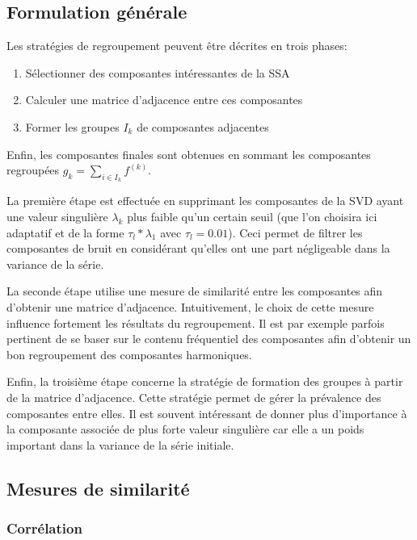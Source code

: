 \documentclass{gretsi}
\begin{document}
\subsection{Formulation générale}
\label{sub:form}

Les stratégies de regroupement peuvent être décrites en trois phases:
\begin{enumerate}
	\item Sélectionner des composantes intéressantes de la SSA
	\item Calculer une matrice d'adjacence entre ces composantes
	\item Former les groupes $I_k$ de composantes adjacentes
\end{enumerate}
Enfin, les composantes finales sont obtenues en sommant les composantes regroupées $g_k = \sum_{i\in I_k} f^{(k)}$.

La première étape est effectuée en supprimant les composantes de la SVD ayant une valeur singulière $\lambda_k$ plus faible qu'un certain seuil (que l'on choisira ici adaptatif et de la forme  $\tau_l*\lambda_1$ avec $\tau_l = 0.01$).
Ceci permet de filtrer les composantes de bruit en considérant qu'elles ont une part négligeable dans la variance de la série.

La seconde étape utilise une mesure de similarité entre les composantes afin d'obtenir une matrice d'adjacence. Intuitivement, le choix de cette mesure influence fortement les résultats du regroupement.
Il est par exemple parfois pertinent de se  baser sur le contenu fréquentiel des composantes afin d'obtenir un bon regroupement des composantes harmoniques.

Enfin, la troisième étape concerne la stratégie de formation des groupes à partir de la matrice d'adjacence. Cette stratégie permet de gérer la prévalence des composantes entre elles.
Il est souvent intéressant de donner plus d'importance à la composante associée de plus forte valeur singulière car elle a un poids important dans la variance de la série initiale.


\subsection{Mesures de similarité}
\label{sub:sim}

\subsubsection{Corrélation}\label{ssub:cor}
\end{document}

